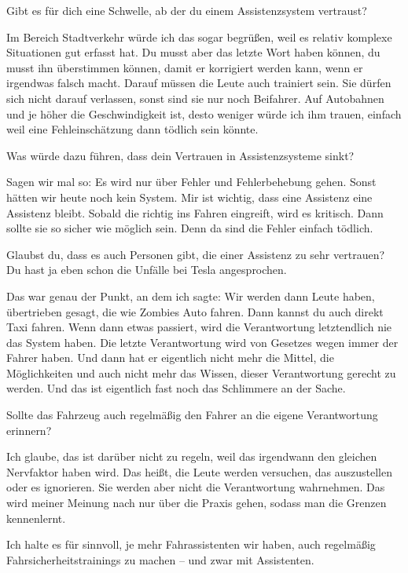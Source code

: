 \interviewerin
Gibt es für dich eine Schwelle, ab der du einem Assistenzsystem
vertraust?

Im Bereich Stadtverkehr würde ich das sogar begrüßen, weil es relativ
komplexe Situationen gut erfasst hat. Du musst aber das letzte Wort
haben können, du musst ihn überstimmen können, damit er korrigiert
werden kann, wenn er irgendwas falsch macht. Darauf müssen die Leute
auch trainiert sein. Sie dürfen sich nicht darauf verlassen, sonst sind
sie nur noch Beifahrer. Auf Autobahnen und je höher die Geschwindigkeit
ist, desto weniger würde ich ihm trauen, einfach weil eine
Fehleinschätzung dann tödlich sein könnte.

\interviewerin
Was würde dazu führen, dass dein Vertrauen in Assistenzsysteme sinkt?

Sagen wir mal so: Es wird nur über Fehler und Fehlerbehebung gehen.
Sonst hätten wir heute noch kein System. Mir ist wichtig, dass eine
Assistenz eine Assistenz bleibt. Sobald die richtig ins Fahren
eingreift, wird es kritisch. Dann sollte sie so sicher wie möglich sein.
Denn da sind die Fehler einfach tödlich.

\interviewerin
Glaubst du, dass es auch Personen gibt, die einer Assistenz zu sehr
vertrauen? Du hast ja eben schon die Unfälle bei Tesla angesprochen.

Das war genau der Punkt, an dem ich sagte: Wir werden dann Leute haben,
übertrieben gesagt, die wie Zombies Auto fahren. Dann kannst du auch
direkt Taxi fahren. Wenn dann etwas passiert, wird die Verantwortung
letztendlich nie das System haben. Die letzte Verantwortung wird von
Gesetzes wegen immer der Fahrer haben. Und dann hat er eigentlich nicht
mehr die Mittel, die Möglichkeiten und auch nicht mehr das Wissen,
dieser Verantwortung gerecht zu werden. Und das ist eigentlich fast
noch das Schlimmere an der Sache.

\interviewerin
Sollte das Fahrzeug auch regelmäßig den Fahrer an die eigene
Verantwortung erinnern?

Ich glaube, das ist darüber nicht zu regeln, weil das irgendwann den
gleichen Nervfaktor haben wird. Das heißt, die Leute werden versuchen,
das auszustellen oder es ignorieren. Sie werden aber nicht die
Verantwortung wahrnehmen. Das wird meiner Meinung nach nur über die
Praxis gehen, sodass man die Grenzen kennenlernt.

\interviewerin
Ich halte es für sinnvoll, je mehr Fahrassistenten wir haben, auch
regelmäßig Fahrsicherheitstrainings zu machen – und zwar mit
Assistenten.

